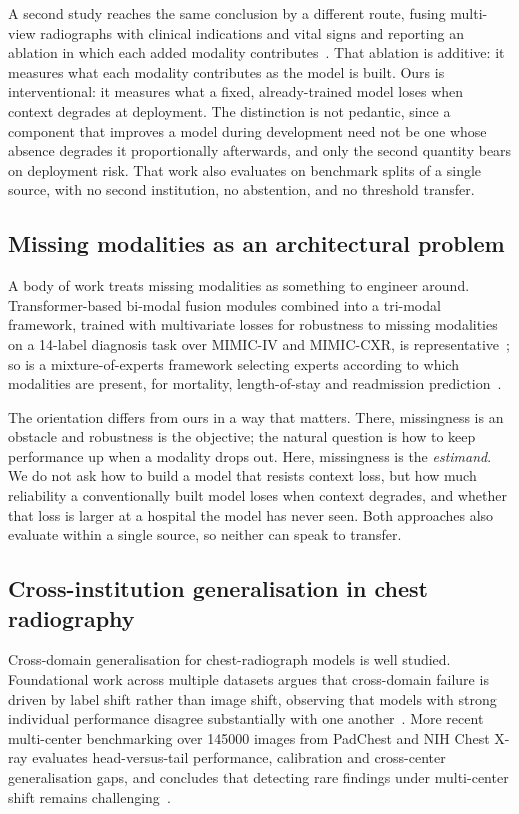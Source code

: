 A second study reaches the same conclusion by a different route, fusing
multi-view radiographs with clinical indications and vital signs and reporting
an ablation in which each added modality
contributes~\cite{sloan2025clinically}. That ablation is additive: it measures
what each modality contributes as the model is built. Ours is interventional: it
measures what a fixed, already-trained model loses when context degrades at
deployment. The distinction is not pedantic, since a component that improves a
model during development need not be one whose absence degrades it
proportionally afterwards, and only the second quantity bears on deployment
risk. That work also evaluates on benchmark splits of a single source, with no
second institution, no abstention, and no threshold transfer.

\subsection{Missing modalities as an architectural problem}

A body of work treats missing modalities as something to engineer around.
Transformer-based bi-modal fusion modules combined into a tri-modal framework,
trained with multivariate losses for robustness to missing modalities on a
14-label diagnosis task over MIMIC-IV and MIMIC-CXR, is
representative~\cite{wang2025missing}; so is a mixture-of-experts framework
selecting experts according to which modalities are present, for mortality,
length-of-stay and readmission prediction~\cite{wang2025moehealth}.

The orientation differs from ours in a way that matters. There, missingness is
an obstacle and robustness is the objective; the natural question is how to keep
performance up when a modality drops out. Here, missingness is the
\emph{estimand}. We do not ask how to build a model that resists context loss,
but how much reliability a conventionally built model loses when context
degrades, and whether that loss is larger at a hospital the model has never
seen. Both approaches also evaluate within a single source, so neither can speak
to transfer.

\subsection{Cross-institution generalisation in chest radiography}

Cross-domain generalisation for chest-radiograph models is well studied.
Foundational work across multiple datasets argues that cross-domain failure is
driven by label shift rather than image shift, observing that models with strong
individual performance disagree substantially with one
another~\cite{cohen2020limits}. More recent multi-center benchmarking over
\num{145000} images from PadChest and NIH Chest X-ray evaluates head-versus-tail
performance, calibration and cross-center generalisation gaps, and concludes
that detecting rare findings under multi-center shift remains
challenging~\cite{cxrlt2026}.

